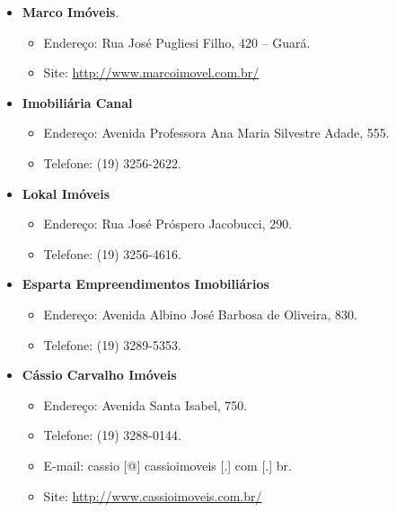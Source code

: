 \begin{itemize}
\item  \textbf{Marco Imóveis}.
\begin{itemize}
\item  Endereço: Rua José Pugliesi Filho, 420 -- Guará.
\item  Site: \url{http://www.marcoimovel.com.br/}
\end{itemize}
\end{itemize}

\begin{itemize}
\item  \textbf{Imobiliária Canal}
\begin{itemize}
\item  Endereço: Avenida Professora Ana Maria Silvestre Adade, 555.
\item  Telefone: (19) 3256-2622.
\end{itemize}
\end{itemize}

\begin{itemize}
\item  \textbf{Lokal Imóveis}
\begin{itemize}
\item  Endereço: Rua José Próspero Jacobucci, 290.
\item  Telefone: (19) 3256-4616.
\end{itemize}
\end{itemize}

\begin{itemize}
\item  \textbf{Esparta Empreendimentos Imobiliários}
\begin{itemize}
\item  Endereço: Avenida Albino José Barbosa de Oliveira, 830.
\item  Telefone: (19) 3289-5353.
\end{itemize}
\end{itemize}

\begin{itemize}
\item  \textbf{Cássio Carvalho Imóveis}
\begin{itemize}
\item  Endereço: Avenida Santa Isabel, 750.
\item  Telefone: (19) 3288-0144.
\item  E-mail: cassio [@] cassioimoveis [.] com [.] br.
\item  Site: \url{http://www.cassioimoveis.com.br/}
\end{itemize}
\end{itemize}

